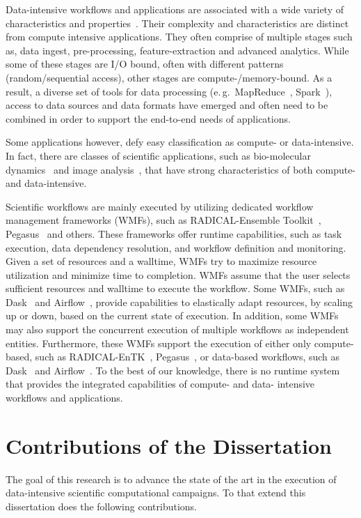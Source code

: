 Data-intensive workflows and applications are associated with a wide variety of characteristics and properties~\cite{fox2014towards,fox2014big}.
Their complexity and characteristics are distinct from compute intensive applications.
They often comprise of multiple stages such as, data ingest, pre-processing, feature-extraction and advanced analytics.
While some of these stages are I/O bound, often with different patterns (random/sequential access), other stages are compute-/memory-bound.
As a result, a diverse set of tools for data processing (e.\,g.\ MapReduce~\cite{dean2004mapreduce}, Spark~\cite{zaharia2010spark}), access to data sources and data formats have emerged and often need to be combined in order to support the end-to-end needs of applications.

Some applications however, defy easy classification as compute- or data-intensive.
In fact, there are classes of scientific applications, such as bio-molecular dynamics~\cite{dror2012biomolecular} and image analysis~\cite{goncalves2020sealnet}, that have strong characteristics of both compute- and data-intensive.

Scientific workflows are mainly executed by utilizing dedicated workflow management frameworks (WMFs), such as RADICAL-Ensemble Toolkit~\cite{balasubramanian2018harnessing}, Pegasus~\cite{deelman2015pegasus} and others.
These frameworks offer runtime capabilities, such as task execution, data dependency resolution, and workflow definition and monitoring.
Given a set of resources and a walltime, WMFs try to maximize resource utilization and minimize time to completion.
WMFs assume that the user selects sufficient resources and walltime to execute the workflow.
Some WMFs, such as Dask~\cite{rocklin2015dask} and Airflow~\cite{airflow}, provide capabilities to elastically adapt resources, by scaling up or down, based on the current state of execution.
In addition, some  WMFs~\cite{deelman2015pegasus} may also support the concurrent execution of multiple workflows as independent entities.
Furthermore, these WMFs support the execution of either only compute-based, such as RADICAL-EnTK~\cite{balasubramanian2018harnessing}, Pegasus~\cite{deelman2015pegasus}, or data-based workflows, such as Dask~\cite{rocklin2015dask} and Airflow~\cite{airflow}.
To the best of our knowledge, there is no runtime system that provides the integrated capabilities of compute- and data- intensive workflows and applications.

\section{Contributions of the Dissertation}
The goal of this research is to advance the state of the art in the execution of data-intensive scientific computational campaigns.
To that extend this dissertation does the following contributions.

